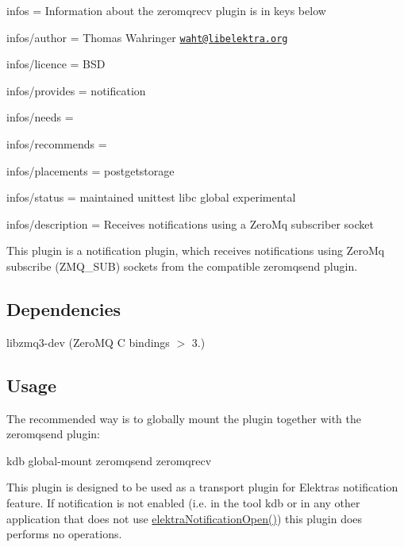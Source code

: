
\begin{DoxyItemize}
\item infos = Information about the zeromqrecv plugin is in keys below
\item infos/author = Thomas Wahringer \href{mailto:waht@libelektra.org}{\tt waht@libelektra.\+org}
\item infos/licence = B\+SD
\item infos/provides = notification
\item infos/needs =
\item infos/recommends =
\item infos/placements = postgetstorage
\item infos/status = maintained unittest libc global experimental
\item infos/description = Receives notifications using a Zero\+Mq subscriber socket
\end{DoxyItemize}

This plugin is a notification plugin, which receives notifications using Zero\+Mq subscribe ({\ttfamily Z\+M\+Q\+\_\+\+S\+UB}) sockets from the compatible zeromqsend plugin.

\subsection*{Dependencies}


\begin{DoxyItemize}
\item {\ttfamily libzmq3-\/dev} (Zero\+MQ C bindings $>$ 3.)
\end{DoxyItemize}

\subsection*{Usage}

The recommended way is to globally mount the plugin together with the zeromqsend plugin\+: \begin{DoxyVerb}kdb global-mount zeromqsend zeromqrecv
\end{DoxyVerb}


This plugin is designed to be used as a transport plugin for Elektra\textquotesingle{}s notification feature. If notification is not enabled (i.\+e. in the tool {\ttfamily kdb} or in any other application that does not use {\ttfamily \hyperlink{group__kdbnotification_gaeae96154abdb5fdbf1b34a01e2b23e44}{elektra\+Notification\+Open()}}) this plugin does performs no operations.

